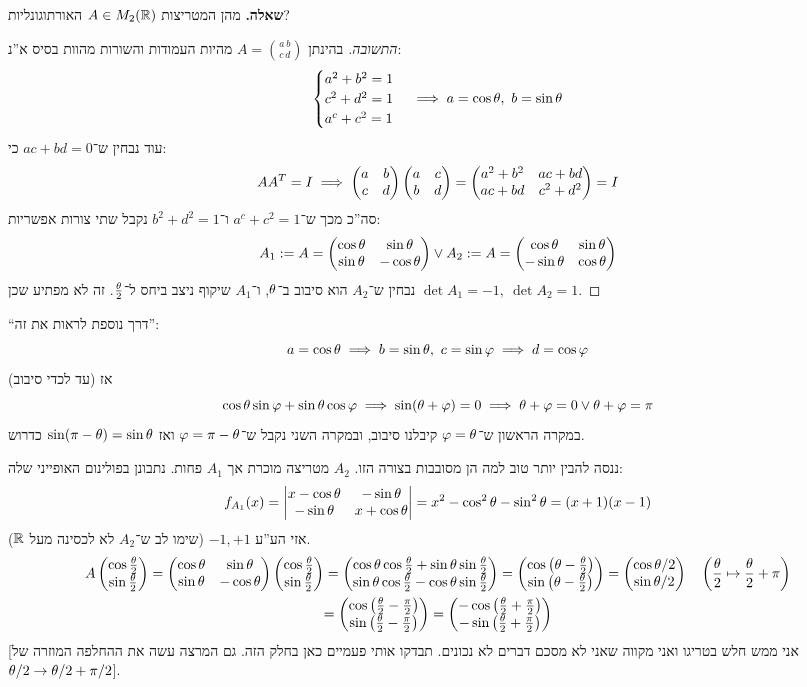 \documentclass[]{../../../../tex/classes/styledArticle}
\begin{document}
	\textbf{שאלה. }מהן המטריצות $A \in M_2(\mathbb{R})$ האורתוגונליות? \begin{proof}[התשובה]
		בהינתן $A = \binom{a\, b}{c\, d}$ מהיות העמודות והשורות מהוות בסיס א''נ:
		\[ \begin{cases}
			a^2 + b^2 = 1 \\
			c^2 + d^2 = 1 \\
			a^c + c^2 = 1 \\
		\end{cases} \implies a = \cos\theta, \ b = \sin\theta \]
		עוד נבחין ש־$ac + bd = 0$ כי: 
		\[ AA^T = I \implies \begin{pmatrix} a & b \\ c & d \end{pmatrix}\begin{pmatrix} a & c \\ b & d \end{pmatrix} = \begin{pmatrix} a^2 + b^2 & ac + bd \\ ac + bd & c^2 + d^2 \end{pmatrix} = I \]
		סה''כ מכך ש־$a^c + c^2 = 1$ ו־$b^2 + d^2 = 1$ נקבל שתי צורות אפשריות: 
		\[ A_1:= A = \begin{pmatrix} \cos\theta & \sin\theta \\ \sin\theta & -\cos\theta \end{pmatrix} \lor A_2:= A = \begin{pmatrix} \cos\theta&\sin\theta \\ -\sin\theta & \cos\theta \end{pmatrix} \]
		נבחין ש־$A_2$ הוא סיבוב ב־$\theta$, ו־$A_1$ שיקוף ניצב ביחס ל־$\frac{\theta}{2}$. זה לא מפתיע שכן $\det A_1 = -1, \ \det A_2 = 1$. 	
	\end{proof}
	``דרך נוספת לראות את זה'': 
	\[ a = \cos\theta \implies b = \sin\theta, \ c = \sin\varphi \implies d = \cos\varphi \]
	אז (עד לכדי סיבוב)
	\[ \cos\theta \sin\varphi + \sin\theta \cos\varphi \implies \sin(\theta + \varphi) = 0 \implies \theta + \varphi = 0 \lor \theta + \varphi = \pi \]
	במקרה הראשון ש־$\varphi = \theta$ קיבלנו סיבוב, ובמקרה השני נקבל ש־$\varphi = \pi - \theta$ ואז $\sin(\pi - \theta) = \sin \theta$ כדרוש. 
	
	ננסה להבין יותר טוב למה הן מסובבות בצורה הזו. $A_2$ מטריצה מוכרת אך $A_1$ פחות. נתבונן בפולינום האופייני שלה: 
	\[ f_{A_1}(x) = \left \lvert \begin{matrix}
			x - \cos\theta & -\sin\theta \\ -\sin\theta & x + \cos\theta
	\end{matrix} \right \rvert = x^2 - \cos^2 \theta - \sin^2\theta = (x + 1)(x - 1) \]
אזי הע''ע $-1, +1$ (שימו לב ש־$A_2$ לא לכסינה מעל $\mathbb{R}$). 
	\begin{multline*}
		A\begin{pmatrix} \cos\frac{\theta}{2}\\\sin\frac{\theta}{2} \end{pmatrix} = \begin{pmatrix} \cos\theta & \sin\theta \\ \sin\theta & -\cos\theta \end{pmatrix} \begin{pmatrix} \cos\frac{\theta}{2} \\ \sin\frac{\theta}{2} \end{pmatrix} = \begin{pmatrix} \cos \theta \cos \frac{\theta}{2} + \sin\theta \sin\frac{\theta}{2} \\ \sin\theta\cos\frac{\theta}{2} - \cos\theta\sin\frac{\theta}{2} \end{pmatrix} = \begin{pmatrix} \cos\left ( \theta - \frac{\theta}{2} \right ) \\ \sin\left ( \theta - \frac{\theta}{2} \right ) \end{pmatrix} = \begin{pmatrix} \cos\theta/2 \\ \sin\theta/2 \end{pmatrix} \quad \left ( \frac{\theta}{2} \mapsto \frac{\theta}{2} + \pi \right ) \\
		 = \begin{pmatrix} \cos\left ( \frac{\theta}{2} - \frac{\pi}{2} \right ) \\ \sin\left ( \frac{\theta}{2} - \frac{\pi}{2} \right ) \end{pmatrix} = \begin{pmatrix} -\cos\left ( \frac{\theta}{2} + \frac{\pi}{2} \right ) \\ -\sin\left ( \frac{\theta}{2} + \frac{\pi}{2} \right ) \end{pmatrix} 
	\end{multline*}
	[אני ממש חלש בטריגו ואני מקווה שאני לא מסכם דברים לא נכונים. תבדקו אותי פעמיים כאן בחלק הזה. גם המרצה עשה את ההחלפה המוזרה של $\theta/2 \to \theta/2 + \pi/2$]. 
	
\end{document}
